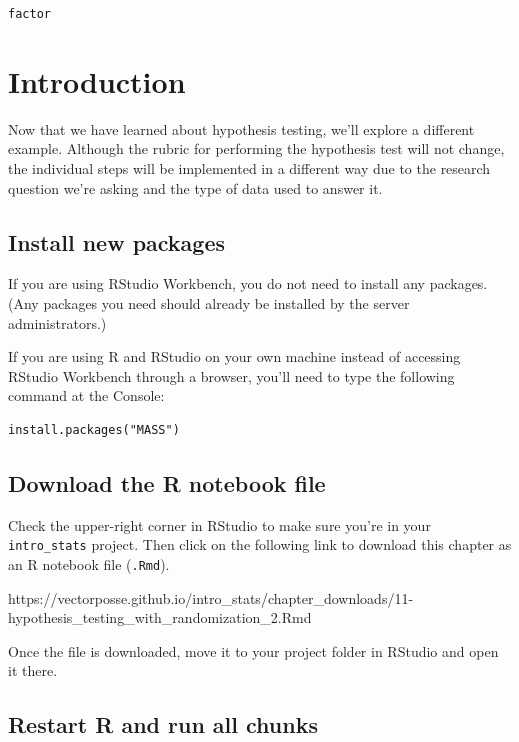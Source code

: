 \documentclass[
]{book}
\begin{document}
\texttt{factor}

\hypertarget{hypothesis2-intro}{%
\section{Introduction}\label{hypothesis2-intro}}

Now that we have learned about hypothesis testing, we'll explore a different example. Although the rubric for performing the hypothesis test will not change, the individual steps will be implemented in a different way due to the research question we're asking and the type of data used to answer it.

\hypertarget{hypothesis2-install}{%
\subsection{Install new packages}\label{hypothesis2-install}}

If you are using RStudio Workbench, you do not need to install any packages. (Any packages you need should already be installed by the server administrators.)

If you are using R and RStudio on your own machine instead of accessing RStudio Workbench through a browser, you'll need to type the following command at the Console:

\begin{verbatim}
install.packages("MASS")
\end{verbatim}

\hypertarget{hypothesis2-download}{%
\subsection{Download the R notebook file}\label{hypothesis2-download}}

Check the upper-right corner in RStudio to make sure you're in your \texttt{intro\_stats} project. Then click on the following link to download this chapter as an R notebook file (\texttt{.Rmd}).

https://vectorposse.github.io/intro\_stats/chapter\_downloads/11-hypothesis\_testing\_with\_randomization\_2.Rmd

Once the file is downloaded, move it to your project folder in RStudio and open it there.

\hypertarget{hypothesis2-restart}{%
\subsection{Restart R and run all chunks}\label{hypothesis2-restart}}
\end{document}
